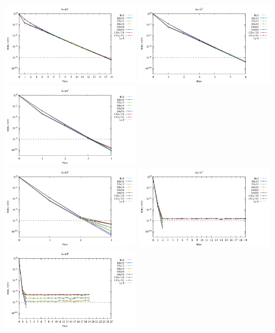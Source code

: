 \begin{center}
\includegraphics[width=5.7cm]{python_codes/fieldstone_161/results/bench1/conv1.pdf}
\includegraphics[width=5.7cm]{python_codes/fieldstone_161/results/bench1/conv2.pdf}
\includegraphics[width=5.7cm]{python_codes/fieldstone_161/results/bench1/conv3.pdf}\\
\includegraphics[width=5.7cm]{python_codes/fieldstone_161/results/bench1/conv4.pdf}
\includegraphics[width=5.7cm]{python_codes/fieldstone_161/results/bench1/conv5.pdf}
\includegraphics[width=5.7cm]{python_codes/fieldstone_161/results/bench1/conv6.pdf}
\end{center}

